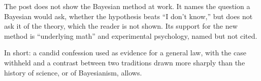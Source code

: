 \begin{afterword}
The post does not show the Bayesian method at work. It names the question a Bayesian would ask, whether the hypothesis beats ``I don't know,'' but does not ask it of the theory, which the reader is not shown. Its support for the new method is ``underlying math'' and experimental psychology, named but not cited.

In short: a candid confession used as evidence for a general law, with the case withheld and a contrast between two traditions drawn more sharply than the history of science, or of Bayesianism, allows.
\end{afterword}
